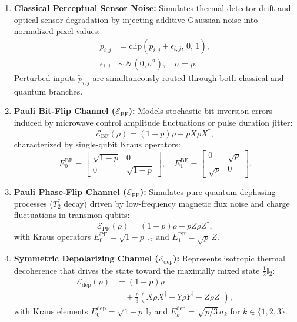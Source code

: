 \documentclass[journal]{IEEEtran}
\begin{document}
\begin{enumerate}
    \item \textbf{Classical Perceptual Sensor Noise:} Simulates thermal detector drift and optical sensor degradation by injecting additive Gaussian noise into normalized pixel values:
    \begin{align}
    \tilde{p}_{i,j} &= \mathrm{clip}\left( p_{i,j} + \epsilon_{i,j}, \, 0, \, 1 \right), \nonumber \\
    \epsilon_{i,j} &\sim \mathcal{N}(0, \sigma^2), \quad \sigma = p.
    \label{eq:gaussian_pixel_noise}
    \end{align}
    Perturbed inputs $\tilde{p}_{i,j}$ are simultaneously routed through both classical and quantum branches.
    \item \textbf{Pauli Bit-Flip Channel ($\mathcal{E}_{\mathrm{BF}}$):} Models stochastic bit inversion errors induced by microwave control amplitude fluctuations or pulse duration jitter:
    \begin{equation}
    \mathcal{E}_{\mathrm{BF}}(\rho) = (1 - p)\rho + p X \rho X^\dagger,
    \label{eq:bitflip_cptp}
    \end{equation}
    characterized by single-qubit Kraus operators:
    \begin{equation}
    E_0^{\mathrm{BF}} = \begin{bmatrix} \sqrt{1-p} & 0 \\ 0 & \sqrt{1-p} \end{bmatrix}, \quad E_1^{\mathrm{BF}} = \begin{bmatrix} 0 & \sqrt{p} \\ \sqrt{p} & 0 \end{bmatrix}.
    \label{eq:kraus_bitflip_matrix}
    \end{equation}
    \item \textbf{Pauli Phase-Flip Channel ($\mathcal{E}_{\mathrm{PF}}$):} Simulates pure quantum dephasing processes ($T_2^*$ decay) driven by low-frequency magnetic flux noise and charge fluctuations in transmon qubits:
    \begin{equation}
    \mathcal{E}_{\mathrm{PF}}(\rho) = (1 - p)\rho + p Z \rho Z^\dagger,
    \label{eq:phaseflip_cptp}
    \end{equation}
    with Kraus operators $E_0^{\mathrm{PF}} = \sqrt{1-p}\,\mathbb{I}_2$ and $E_1^{\mathrm{PF}} = \sqrt{p}\,Z$.
    \item \textbf{Symmetric Depolarizing Channel ($\mathcal{E}_{\mathrm{dep}}$):} Represents isotropic thermal decoherence that drives the state toward the maximally mixed state $\frac{1}{2}\mathbb{I}_2$:
    \begin{align}
    \mathcal{E}_{\mathrm{dep}}(\rho) &= (1 - p)\rho \nonumber \\
    &\quad + \frac{p}{3}\left( X\rho X^\dagger + Y\rho Y^\dagger + Z\rho Z^\dagger \right),
    \label{eq:depolarizing_cptp}
    \end{align}
    with Kraus elements $E_0^{\mathrm{dep}} = \sqrt{1-p}\,\mathbb{I}_2$ and $E_k^{\mathrm{dep}} = \sqrt{p/3}\,\sigma_k$ for $k \in \{1, 2, 3\}$.
\end{enumerate}
\end{document}
